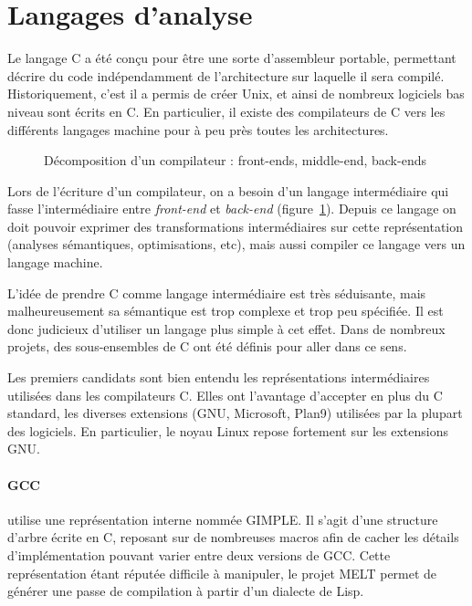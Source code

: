 \section{Langages d'analyse}

Le langage C \cite{KandR,AnsiC} a été conçu pour être une sorte d'assembleur
portable, permettant décrire du code indépendamment de l'architecture sur
laquelle il sera compilé. Historiquement, c'est il a permis de créer Unix, et
ainsi de nombreux logiciels bas niveau sont écrits en C. En particulier, il
existe des compilateurs de C vers les différents langages machine pour à peu
près toutes les architectures.

\begin{figure}
  \centering

  

  \caption{Décomposition d'un compilateur : front-ends, middle-end, back-ends}
  \label{fig:middle-end}
\end{figure}

Lors de l'écriture d'un compilateur, on a besoin d'un langage intermédiaire qui
fasse l'intermédiaire entre \emph{front-end} et \emph{back-end}
(figure~\ref{fig:middle-end}). Depuis ce langage on doit pouvoir exprimer des
transformations intermédiaires sur cette représentation (analyses sémantiques,
optimisations, etc), mais aussi compiler ce langage vers un langage machine.

L'idée de prendre C comme langage intermédiaire est très séduisante, mais
malheureusement sa sémantique est trop complexe et trop peu spécifiée. Il est
donc judicieux d'utiliser un langage plus simple à cet effet. Dans de nombreux
projets, des sous-ensembles de C ont été définis pour aller dans ce sens.

Les premiers candidats sont bien entendu les représentations intermédiaires
utilisées dans les compilateurs C. Elles ont l'avantage d'accepter en plus du C
standard, les diverses extensions (GNU, Microsoft, Plan9) utilisées par la
plupart des logiciels. En particulier, le noyau Linux repose fortement sur les
extensions GNU.

\paragraph{GCC} utilise une représentation interne nommée
GIMPLE\cite{gcc-gimple}. Il s'agit d'une structure d'arbre écrite en C, reposant
sur de nombreuses macros afin de cacher les détails d'implémentation pouvant
varier entre deux versions de GCC. Cette représentation étant réputée difficile
à manipuler, le projet MELT\cite{gcc-melt} permet de générer une passe de
compilation à partir d'un dialecte de Lisp.

